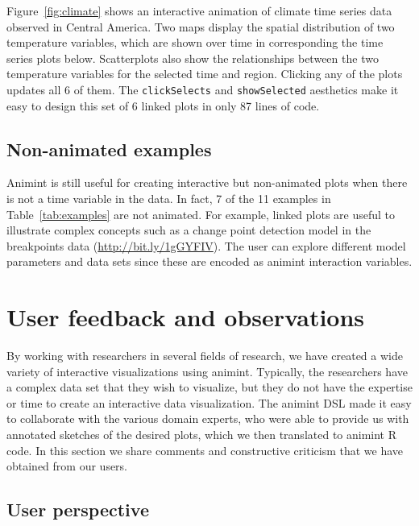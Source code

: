 \documentclass[journal]{vgtc}\usepackage[]{graphicx}\usepackage[]{color}
\begin{document}
Figure~\ref{fig:climate} shows an interactive animation of climate
time series data observed in Central America. Two maps display the
spatial distribution of two temperature variables, which are shown
over time in corresponding the time series plots below. Scatterplots
also show the relationships between the two temperature variables for
the selected time and region. Clicking any of the plots updates all 6
of them. The \texttt{clickSelects} and \texttt{showSelected} aesthetics make it easy to
design this set of 6 linked plots in only 87 lines of code.

\subsection{Non-animated examples}

Animint is still useful for creating interactive but
non-animated plots when there is not a time variable in the data.
In fact, 7 of the 11 examples in
Table~\ref{tab:examples} are not animated. For example, linked plots
are useful to illustrate complex concepts such as a change point
detection model in the breakpoints data
(\url{http://bit.ly/1gGYFIV}). The user can explore different model
parameters and data sets since these are encoded as animint
interaction variables.

\section{User feedback and observations}

By working with researchers in several fields of research,
we have created a wide variety of
interactive visualizations using animint.
Typically, the researchers have a complex data set that
they wish to visualize,
but they do not have the expertise or time to create
an interactive data visualization.
The animint DSL made it easy to collaborate with the various domain experts,
who were able to provide us with annotated sketches of the desired plots,
which we then translated to animint R code.
In this section we share comments and
constructive criticism that we have obtained from our users.

\subsection{User perspective}
\end{document}

